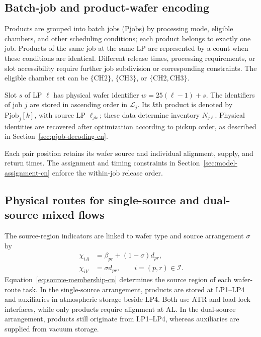 \documentclass[final,5p,times,twocolumn]{elsarticle}
\begin{document}
\subsection{Batch-job and product-wafer encoding}
\label{sec:model-encoding-cn}
Products are grouped into batch jobs (Pjobs) by processing mode, eligible chambers, and other scheduling conditions; each product belongs to exactly one job. Products of the same job at the same LP are represented by a count when these conditions are identical. Different release times, processing requirements, or slot accessibility require further job subdivision or corresponding constraints. The eligible chamber set can be $\{\mathrm{CH2}\}$, $\{\mathrm{CH3}\}$, or $\{\mathrm{CH2},\mathrm{CH3}\}$.

Slot $s$ of LP $\ell$ has physical wafer identifier $w=25(\ell-1)+s$. The identifiers of job $j$ are stored in ascending order in $\mathcal L_j$. Its $k$th product is denoted by $\mathrm{Pjob}_j[k]$, with source LP $\ell_{jk}$; these data determine inventory $N_{j\ell}$. Physical identities are recovered after optimization according to pickup order, as described in Section~\ref{sec:pjob-decoding-cn}.

Each pair position retains its wafer source and individual alignment, supply, and return times. The assignment and timing constraints in Section~\ref{sec:model-assignment-cn} enforce the within-job release order.

\subsection{Physical routes for single-source and dual-source mixed flows}
\label{sec:model-path-cn}
The source-region indicators are linked to wafer type and source arrangement $\sigma$ by
\begin{equation}
\begin{aligned}
\chi_{iA}&=\beta_{pr}+(1-\sigma)d_{pr},\\
\chi_{iV}&=\sigma d_{pr},\qquad i=(p,r)\in\mathcal I.
\end{aligned}
\label{eq:source-membership-cn}
\end{equation}
Equation~\eqref{eq:source-membership-cn} determines the source region of each wafer-route task. In the single-source arrangement, products are stored at LP1--LP4 and auxiliaries in atmospheric storage beside LP4. Both use ATR and load-lock interfaces, while only products require alignment at AL. In the dual-source arrangement, products still originate from LP1--LP4, whereas auxiliaries are supplied from vacuum storage.
\end{document}

